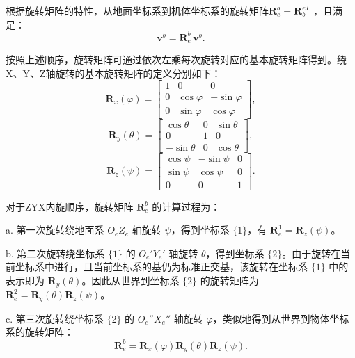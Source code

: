根据旋转矩阵的特性，从地面坐标系到机体坐标系的旋转矩阵$\boldsymbol{R}_{e}^{b} = \boldsymbol{R}_{b}^{eT}$ ，且满足：
\begin{equation}
\boldsymbol{v}^b = \boldsymbol{R}_{e}^{b} \, \boldsymbol{v}^b.
\end{equation}

按照上述顺序，旋转矩阵可通过依次左乘每次旋转对应的基本旋转矩阵得到。绕X、Y、Z轴旋转的基本旋转矩阵的定义分别如下：
\begin{equation}
\boldsymbol{R}_x(\varphi) = \begin{bmatrix}
1 & 0 & 0 \\
0 & \cos\varphi & -\sin\varphi \\
0 & \sin\varphi & \cos\varphi
\end{bmatrix},
\end{equation}
\begin{equation}
\boldsymbol{R}_y(\theta) = \begin{bmatrix}
\cos\theta & 0 & \sin\theta \\
0 & 1 & 0 \\
-\sin\theta & 0 & \cos\theta
\end{bmatrix},
\end{equation}
\begin{equation}
\boldsymbol{R}_z(\psi) = \begin{bmatrix}
\cos\psi & -\sin\psi & 0 \\
\sin\psi & \cos\psi & 0 \\
0 & 0 & 1
\end{bmatrix}.
\label{eq:single_eular_R}
\end{equation}

对于ZYX内旋顺序，旋转矩阵 $\boldsymbol{R}_{e}^{b}$ 的计算过程为：

a. 第一次旋转绕地面系 $O_eZ_e$ 轴旋转 $\psi$，得到坐标系 $\{1\}$，有 $\boldsymbol{R}_{e}^{1} = \boldsymbol{R}_z(\psi)$。

b. 第二次旋转绕坐标系 $\{1\}$ 的 $O_e'Y_e'$ 轴旋转 $\theta$，得到坐标系 $\{2\}$。由于旋转在当前坐标系中进行，且当前坐标系的基仍为标准正交基，该旋转在坐标系 $\{1\}$ 中的表示即为 $\boldsymbol{R}_y(\theta)$。因此从世界到坐标系 $\{2\}$ 的旋转矩阵为 $\boldsymbol{R}_{e}^{2} = \boldsymbol{R}_y(\theta) \boldsymbol{R}_z(\psi)$。

c. 第三次旋转绕坐标系 $\{2\}$ 的 $O_e''X_e''$ 轴旋转 $\varphi$，类似地得到从世界到物体坐标系的旋转矩阵：
\begin{equation}
\boldsymbol{R}_{e}^{b} = \boldsymbol{R}_x(\varphi) \boldsymbol{R}_y(\theta) \boldsymbol{R}_z(\psi).
\end{equation}

